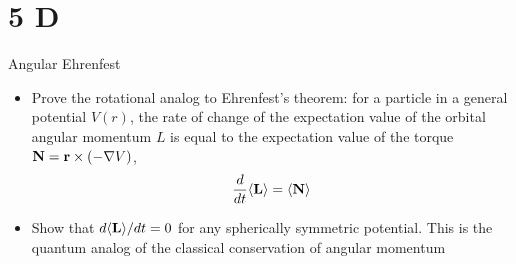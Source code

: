 \documentclass{article}
\begin{document}
\section*{5 D}
\begin{ques}\label{q5}
Angular Ehrenfest

\begin{itemize}
\item[(a)] Prove the rotational analog to Ehrenfest’s theorem: for a particle in a general potential $V(r)$, the rate of change of the expectation value of the orbital angular momentum
$L$ is equal to the expectation value of the torque $\mathbf{N} = \mathbf{r} \times (-\nabla V)$,
\[
\frac{d}{dt}\langle \mathbf{L} \rangle = \langle \mathbf{N} \rangle
\]

\item[(b)] Show that $d\langle \mathbf{L} \rangle/dt = 0$ for any spherically symmetric potential. This is the quantum analog of the classical conservation of angular momentum
\end{itemize}
\end{ques}
\end{document}
